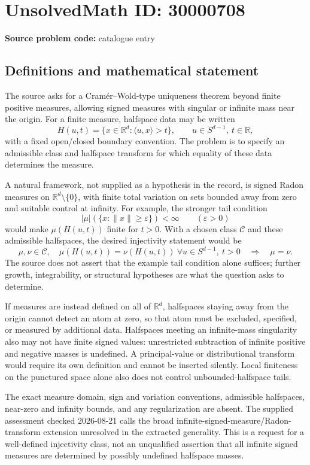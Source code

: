 \documentclass[11pt]{article}
\newcommand{\R}{\mathbb{R}}
\begin{document}
\section*{UnsolvedMath ID: 30000708}
\textbf{Source problem code:} catalogue entry
\subsection{Definitions and mathematical statement}
The source asks for a Cram\'er--Wold-type uniqueness theorem beyond finite positive measures, allowing signed measures with singular or infinite mass near the origin. For a finite measure, halfspace data may be written
\[
H(u,t)=\{x\in\R^d:\langle u,x\rangle>t\},
\qquad u\in S^{d-1},\ t\in\R,
\]
with a fixed open/closed boundary convention. The problem is to specify an admissible class and halfspace transform for which equality of these data determines the measure.

A natural framework, not supplied as a hypothesis in the record, is signed Radon measures on \(\R^d\setminus\{0\}\), with finite total variation on sets bounded away from zero and suitable control at infinity. For example, the stronger tail condition
\[
|\mu|(\{x:\|x\|\geq\varepsilon\})<\infty\qquad(\varepsilon>0)
\]
would make \(\mu(H(u,t))\) finite for \(t>0\). With a chosen class \(\mathcal C\) and these admissible halfspaces, the desired injectivity statement would be
\[
\mu,\nu\in\mathcal C,\quad
\mu(H(u,t))=\nu(H(u,t))\ \forall u\in S^{d-1},\ t>0
\quad\Longrightarrow\quad\mu=\nu.
\]
The source does not assert that the example tail condition alone suffices; further growth, integrability, or structural hypotheses are what the question asks to determine.

If measures are instead defined on all of \(\R^d\), halfspaces staying away from the origin cannot detect an atom at zero, so that atom must be excluded, specified, or measured by additional data. Halfspaces meeting an infinite-mass singularity also may not have finite signed values: unrestricted subtraction of infinite positive and negative masses is undefined. A principal-value or distributional transform would require its own definition and cannot be inserted silently. Local finiteness on the punctured space alone also does not control unbounded-halfspace tails.

The exact measure domain, sign and variation conventions, admissible halfspaces, near-zero and infinity bounds, and any regularization are absent. The supplied assessment checked 2026-08-21 calls the broad infinite-signed-measure/Radon-transform extension unresolved in the extracted generality. This is a request for a well-defined injectivity class, not an unqualified assertion that all infinite signed measures are determined by possibly undefined halfspace masses.
\end{document}
